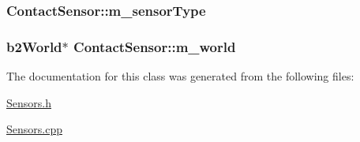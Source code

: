 \hypertarget{classContactSensor_a9249ca2f4872b431a7c78e1fba9ccb4a}{
\subsubsection[{m\-\_\-sensor\-Type}]{ Contact\-Sensor\-::m\-\_\-sensor\-Type}}\label{classContactSensor_a9249ca2f4872b431a7c78e1fba9ccb4a}
\hypertarget{classContactSensor_a9822df2b2841440f6b5df422b017a239}{
\subsubsection[{m\-\_\-world}]{\setlength{\rightskip}{0pt plus 5cm}b2\-World$\ast$ Contact\-Sensor\-::m\-\_\-world}}\label{classContactSensor_a9822df2b2841440f6b5df422b017a239}


The documentation for this class was generated from the following files\-:\begin{DoxyCompactItemize}
\item 
\hyperlink{Sensors_8h}{Sensors.\-h}\item 
\hyperlink{Sensors_8cpp}{Sensors.\-cpp}\end{DoxyCompactItemize}
